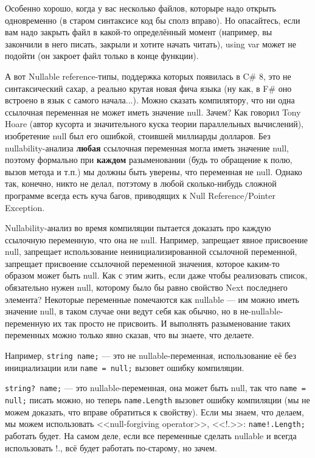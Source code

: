 \documentclass[a5paper]{article}
\begin{document}
Особенно хорошо, когда у вас несколько файлов, которыре надо открыть одновременно (в старом синтаксисе код бы сполз вправо). Но опасайтесь, если вам надо закрыть файл в какой-то определённый момент (например, вы закончили в него писать, закрыли и хотите начать читать), using var может не подойти (он закроет файл только в конце функции).

А вот Nullable reference-типы, поддержка которых появилась в C\# 8, это не синтаксический сахар, а реально крутая новая фича языка (ну как, в F\# оно встроено в язык с самого начала...). Можно сказать компилятору, что ни одна ссылочная переменная не может иметь значение null. Зачем? Как говорил Tony Hoare (автор кусорта и значительного куска теории параллельных вычислений), изобретение null был его ошибкой, стоившей миллиарды долларов. Без nullability-анализа \textbf{любая} ссылочная переменная могла иметь значение null, поэтому формально при \textbf{каждом} разыменовании (будь то обращение к полю, вызов метода и т.п.) мы должны быть уверены, что переменная не null. Однако так, конечно, никто не делал, потэтому в любой сколько-нибудь сложной программе всегда есть куча багов, приводящих к Null Reference/Pointer Exception.

Nullability-анализ во время компиляции пытается доказать про каждую ссылочную переменную, что она не null. Например, запрещает явное присвоение null, запрещает использование неинициализированной ссылочной переменной, запрещает присвоение ссылочной переменной значения, которое каким-то образом может быть null. Как с этим жить, если даже чтобы реализовать список, обязательно нужен null, которому было бы равно свойство Next последнего элемента? Некоторые переменные помечаются как nullable --- им можно иметь значение null, в таком случае они ведут себя как обычно, но в не-nullable-переменную их так просто не присвоить. И выполнять разыменование таких переменных можно только явно сказав, что вы знаете, что делаете. 

Например, \texttt{string name;} --- это не nullable-переменная, использование её без инициализации или \texttt{name = null;} вызовет ошибку компиляции. 

\texttt{string? name;} --- это nullable-переменная, она может быть null, так что \texttt{name = null;} писать можно, но теперь \texttt{name.Length} вызовет ошибку компиляции (мы не можем доказать, что вправе обратиться к свойству). Если мы знаем, что делаем, мы можем использовать <<null-forgiving operator>>, <<!.>>: \texttt{name!.Length;} работать будет. На самом деле, если все переменные сделать nullable и всегда использовать !., всё будет работать по-старому, но зачем.
\end{document}
